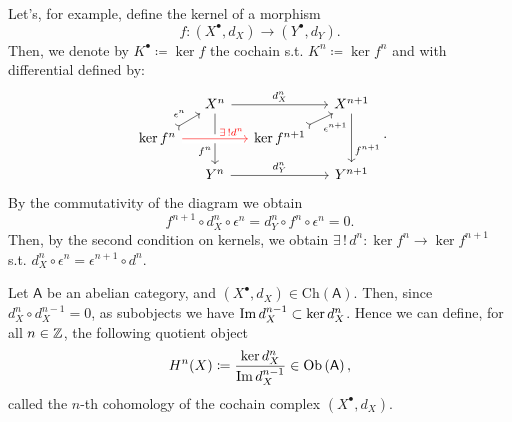 \begin{ex}
	Let's, for example, define the kernel of a morphism
	\begin{equation}
	f\colon \left( X^{\bullet}, d_{X} \right) \to \left( Y^{\bullet}, d_{Y} \right)
	.\end{equation} 
	Then, we denote by $K^{\bullet} \coloneqq \ker f$ the cochain s.t. $K^n \coloneqq \ker f^n$
	and with differential defined by:
	\begin{equation}
		\begin{tikzcd}[column sep=small, row sep=small]
		& X^n \arrow[rr, "d^n_X", rightarrow] \arrow[dd, "f^n"' near end, rightarrow] & &
		X^{n+1} \arrow[dd, "f^{n+1}" near end, rightarrow] \\
		\ker f^n \arrow[ru, "\epsilon^n", tail]
			\arrow[rr, "\exists\, ! d^n" near end, rightarrow, red, crossing over] & &
		\ker f^{n+1} \arrow[ru, "\epsilon^{n+1}"', tail] \\
		& Y^n \arrow[rr, "d^n_Y", rightarrow] & &
		Y^{n+1}
	\end{tikzcd}
	.\end{equation} 
	By the commutativity of the diagram we obtain
	\begin{equation}
	f^{n+1} \circ d^n_X \circ \epsilon^n = 
	d_Y^n \circ f^n \circ \epsilon^n = 0
	.\end{equation} 
	Then, by the second condition on kernels, we obtain $\exists\, !\, d^n\colon \ker f^n \to \ker f^{n+1}$ s.t.
	$d^n_X \circ \epsilon^n = \epsilon^{n+1} \circ d^n$.
\end{ex} 

\begin{defn}[Cohomology]
	Let $\mathsf{A}$ be an abelian category,
	and $\left( X^{\bullet}, d_{X} \right) \in \mathrm{Ch}(\mathsf{A})$.
	Then,  since $d^n_X \circ d^{n-1}_X = 0$, 
	as subobjects we have $\operatorname{Im} d^{n-1}_X \subset \ker d_X^n$.
	Hence we can define, for all $n \in \mathbb{Z}$, the following quotient object
	\begin{equation}
		H^n(X) \coloneqq
		\frac{\ker d^n_X}{\operatorname{Im} d_X^{n-1}} \in \mathrm{Ob} \left(\mathsf{A}\right)
	,\end{equation} 
	called the $n$-th cohomology of the cochain complex $\left( X^{\bullet}, d_{X} \right)$.
\end{defn}

